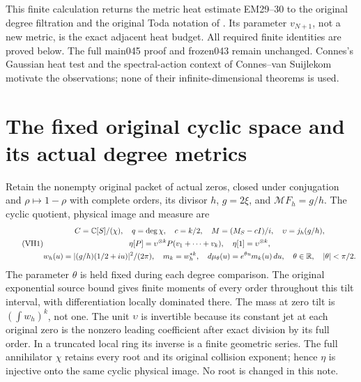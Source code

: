 This finite calculation returns the metric heat estimate EM29--30
\cite{hvh:EM} to the original degree filtration and the original Toda
notation of \cite{hvh:TV}. Its parameter \(v_{N+1}\), not a new metric,
is the exact adjacent heat budget. All required finite identities are
proved below. The full main045 proof and frozen043 remain unchanged.
Connes's Gaussian heat test \cite{hvh:Connes} and the spectral-action
context of Connes--van Suijlekom \cite{hvh:CV} motivate the observations;
none of their infinite-dimensional theorems is used.

\section{The fixed original cyclic space and its actual degree metrics}

Retain the nonempty original packet of actual zeros, closed under
conjugation and \(\rho\mapsto1-\rho\) with complete orders, its divisor
\(h\), \(g=2\xi\), and \(\mathcal MF_h=g/h\).
The cyclic quotient, physical image and measure are
\begin{equation}\tag{VH1}\label{hvh:VH1}
\begin{gathered}
C=\mathbb C[S]/(\chi),\quad q=\deg\chi,\quad c=k/2,\quad
M=(M_S-cI)/i,\quad \upsilon=j_h(g/h),\\
\eta[P]=\upsilon^{\otimes k}P(v_1+\cdots+v_k),\quad
\eta[1]=\upsilon^{\otimes k},\\
w_h(u)=|(g/h)(1/2+iu)|^2/(2\pi),\quad m_k=w_h^{*k},\quad
d\mu_\theta(u)=e^{\theta u}m_k(u)\,du,
\quad\theta\in\mathbb R,\quad|\theta|<\pi/2.
\end{gathered}
\end{equation}
The parameter \(\theta\) is held fixed during each degree comparison.
The original exponential source bound gives finite moments of every
order throughout this tilt interval, with differentiation locally
dominated there. The mass at zero tilt is \((\int w_h)^k\), not one.
The unit \(\upsilon\) is invertible because its constant jet at each
original zero is the nonzero leading coefficient after exact division
by its full order. In a truncated local ring its inverse is a finite
geometric series. The full annihilator \(\chi\) retains every root
and its original collision exponent; hence \(\eta\) is injective
onto the same cyclic physical image. No root is changed in this note.

